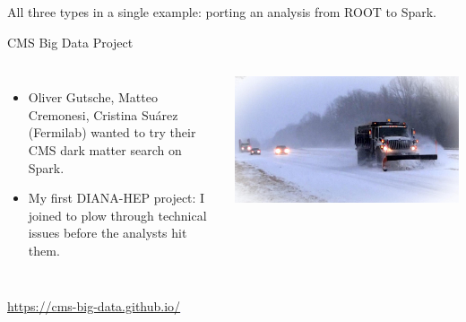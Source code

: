 \documentclass[aspectratio=169]{beamer}
\begin{document}
\begin{frame}{}
\vspace{0.5 cm}
\begin{center}
\begin{minipage}{0.8\linewidth}
\begin{center}
\Large All three types in a single example: porting an analysis from ROOT to Spark.
\end{center}
\end{minipage}
\end{center}
\end{frame}

\begin{frame}{CMS Big Data Project}
\vspace{1 cm}
\begin{columns}
\begin{itemize}
\item Oliver Gutsche, Matteo Cremonesi, Cristina Su\'arez (Fermilab) wanted to try their CMS dark matter search on Spark.
\item My first DIANA-HEP project: I joined to plow through technical issues before the analysts hit them.
\end{itemize}

\includegraphics[width=\linewidth]{snowplow.jpg}
\end{columns}

\vspace{0.25 cm}
\begin{center}
\textcolor{blue}{\underline{\url{https://cms-big-data.github.io/}}}
\end{center}
\end{frame}
\end{document}
